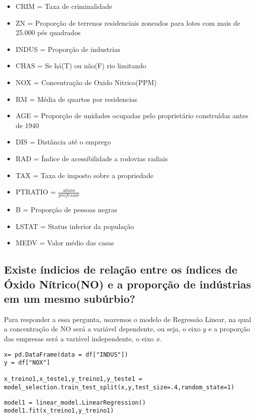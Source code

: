 \documentclass[12pt]{article}
\begin{document}
\begin{itemize}
\item CRIM = Taxa de criminalidade

\item ZN = Proporção de terrenos residenciais zoneados para lotes com mais de 25.000 pés quadrados

\item INDUS = Proporção de industrias

\item CHAS = Se há(T) ou não(F) rio limitando

\item NOX = Concentração de Oxido Nitrico(PPM)

\item RM = Média de quartos por residencias

\item AGE = Proporção de unidades ocupadas pelo proprietário construídas antes de 1940

\item DIS = Distância até o emprego

\item RAD = Índice de acessibilidade a rodovias radiais

\item TAX = Taxa de imposto sobre a propriedade

\item PTRATIO =  $ \frac{aluno}{professor} $
\item B = Proporção de pessoas negras

\item LSTAT = Status inferior da população

\item MEDV = Valor médio das casas
\end{itemize}

\subsection{Existe índicios de relação entre os índices de Óxido Nítrico(NO) e a proporção de indústrias em um mesmo subúrbio?}
Para responder a essa pergunta, usaremos o modelo de Regressão Linear, na qual a concentração de NO será a variável dependente, ou seja, o eixo $y$ e a proporção das empresas será a variável independente, o eixo $x$. 
\begin{lstlisting}
x= pd.DataFrame(data = df["INDUS"])
y = df["NOX"]

x_treino1,x_teste1,y_treino1,y_teste1 = model_selection.train_test_split(x,y,test_size=.4,random_state=1)
\end{lstlisting}
\begin{lstlisting}
model1 = linear_model.LinearRegression()
model1.fit(x_treino1,y_treino1)
\end{lstlisting}
\end{document}

